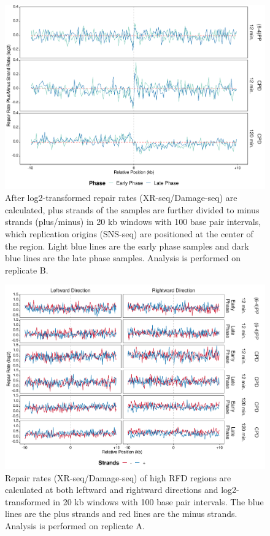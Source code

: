 \begin{figure}[H]
\begin{center}
\includegraphics[width=\textwidth]{Chapters/7_appendix/figures/supfig61}
\caption[Repair rate plus/minus ratio of replication origins in 20 kb (replicate B).]{After log2-transformed repair rates (XR-seq/Damage-seq) are calculated, plus strands of the samples are further divided to minus strands (plus/minus) in 20 kb windows with 100 base pair intervals, which replication origins (SNS-seq) are positioned at the center of the region. Light blue lines are the early phase samples and dark blue lines are the late phase samples. Analysis is performed on replicate B.}
\label{supfig:rrpm20snsB}
\end{center}
\end{figure}

\begin{figure}[H]
\begin{center}
\includegraphics[width=\textwidth]{Chapters/7_appendix/figures/supfig62}
\caption[Repair rate of high RFDs in 20 kb (replicate A).]{Repair rates (XR-seq/Damage-seq) of high RFD regions are calculated at both leftward and rightward directions and log2-transformed in 20 kb windows with 100 base pair intervals. The blue lines are the plus strands and red lines are the minus strands. Analysis is performed on replicate A.}
\label{supfig:rr20rfdA}
\end{center}
\end{figure}

